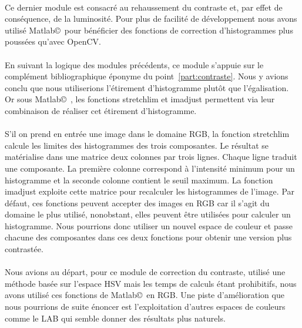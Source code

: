 \documentclass[11pt, french,screen]{report-rd-info}
\begin{document}
\paragraph*{}
Ce dernier module est consacré au rehaussement du contraste et, par effet de conséquence, de la luminosité. Pour plus de facilité de développement nous avons utilisé Matlab\copyright~pour bénéficier des fonctions de correction d'histogrammes plus poussées qu'avec OpenCV.

\paragraph*{}
En suivant la logique des modules précédents, ce module s'appuie sur le complément bibliographique éponyme du point~\ref{part:contraste}. Nous y avions conclu que nous utiliserions l'étirement d'histogramme plutôt que l'égalisation. Or sous Matlab\copyright~, les fonctions stretchlim et imadjust permettent via leur combinaison de réaliser cet étirement d'histogramme.

\paragraph*{}
S'il on prend en entrée une image dans le domaine RGB, la fonction stretchlim calcule les limites des histogrammes des trois composantes. Le résultat se matérialise dans une matrice deux colonnes par trois lignes. Chaque ligne traduit une composante. La première colonne correspond à l'intensité minimum pour un histogramme et la seconde colonne contient le seuil maximum. La fonction imadjust exploite cette matrice pour recalculer les histogrammes de l'image. Par défaut, ces fonctions peuvent accepter des images en RGB car il s'agit du domaine le plus utilisé, nonobstant, elles peuvent être utilisées pour calculer un histogramme. Nous pourrions donc utiliser un nouvel espace de couleur et passe chacune des composantes dans ces deux fonctions pour obtenir une version plus contrastée. 

\paragraph*{}
Nous avions au départ, pour ce module de correction du contraste, utilisé une méthode basée sur l'espace HSV mais les temps de calculs étant prohibitifs, nous avons utilisé ces fonctions de Matlab\copyright~en RGB. Une piste d'amélioration que nous pourrions de suite énoncer est l'exploitation d'autres espaces de couleurs comme le LAB qui semble donner des résultats plus naturels. 
\end{document}
